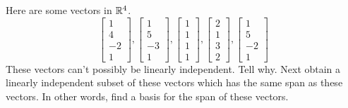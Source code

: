 \documentclass{ximera}
\begin{document}
\begin{problem}\label{prb:3.32} Here are some vectors in $\mathbb{R}^{4}$.
\begin{equation*}
\left[
\begin{array}{r}
1 \\
4 \\
-2 \\
1
\end{array}
\right] ,\left[
\begin{array}{r}
1 \\
5 \\
-3 \\
1
\end{array}
\right] ,\left[
\begin{array}{r}
1 \\
1 \\
1 \\
1
\end{array}
\right] ,\left[
\begin{array}{r}
2 \\
1 \\
3 \\
2
\end{array}
\right] ,\left[
\begin{array}{r}
1 \\
5 \\
-2 \\
1
\end{array}
\right]
\end{equation*}
These vectors can't possibly be linearly independent. Tell why. Next obtain a
linearly independent subset of these vectors which has the same span as
these vectors. In other words, find a basis for the span of these vectors.
\end{problem}
\end{document}
